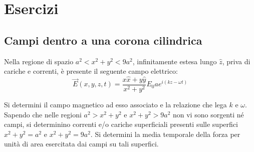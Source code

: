 \section{Esercizi}
	\subsection{Campi dentro a una corona cilindrica}
	Nella regione di spazio $a^2 < x^2 + y^2 < 9 a^2$, infinitamente estesa lungo $\hat z$, priva di cariche e correnti, è presente il seguente campo elettrico:
	\[
		\vec E(x,y,z,t)=\frac{x\hat x+y\hat y}{x^2+y^2}E_0ae^{i(kz-\omega t)}
	\]
	
	Si determini il campo magnetico ad esso associato e la relazione che lega $k$ e $\omega$. Sapendo che nelle
	regioni $a^2 > x^2 + y^2$ e $x^2 + y^2 > 9 a^2$ non vi sono sorgenti né campi, si determinino correnti e/o
	cariche superficiali presenti sulle superfici $x^2 + y^2 = a^2$ e $x^2 + y^2 = 9 a^2$. Si determini la media
	temporale della forza per unità di area esercitata dai campi su tali superfici.